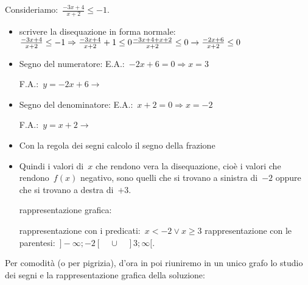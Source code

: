 \begin{exrig}
 \begin{esempio}
Consideriamo:~$\frac{-3 x +4}{x+2} \le -1$.
\begin{itemize}
 \item scrivere la disequazione in forma normale:
 $\frac{-3 x +4}{x+2} \le -1 \Rightarrow \frac{-3 x +4}{x+2} +1 \le 0 \newline
 \frac{-3 x +4 + x +2}{x+2} \le 0 \rightarrow \frac{-2 x +6}{x+2} \le 0$
 \item Segno del numeratore:
 \subitem E.A.:~$-2 x +6=0 \Rightarrow x=3$
 \subitem
  \begin{minipage}{.25\textwidth}
   F.A.:~$y=-2 x +6 \rightarrow $
  \end{minipage}
  \begin{minipage}{.30\textwidth}
  
  \end{minipage}
 \item Segno del denominatore:
 \subitem E.A.:~$x + 2=0 \Rightarrow x=-2$
 \subitem
  \begin{minipage}{.25\textwidth}
   F.A.:~$y=x +2 \rightarrow $
  \end{minipage}
  \begin{minipage}{.30\textwidth}
  
  \end{minipage}
 \item Con la regola dei segni calcolo il segno della frazione 
   
 \item Quindi i valori di~$x$ che rendono vera la disequazione, cioè i valori
  che rendono~$f(x)$ negativo, sono quelli 
  che si trovano a sinistra di~$-2$ oppure che si trovano a destra di~$+3$. 
 \subitem 
  \begin{minipage}{.35\textwidth}
   rappresentazione grafica: 
  \end{minipage}
  \begin{minipage}{.30\textwidth}
   
  \end{minipage}
 \subitem rappresentazione con i predicati:~$x < -2 \lor x \ge 3$ 
 \subitem rappresentazione con le 
  parentesi:~$]-\infty; -2[ \quad \cup \quad ]3; \infty[$. 
\end{itemize}
 \end{esempio}
\end{exrig}

\osservazione Per comodità (o per pigrizia), d'ora in poi riuniremo in un 
unico grafo lo studio dei segni e la rappresentazione grafica della soluzione: 


